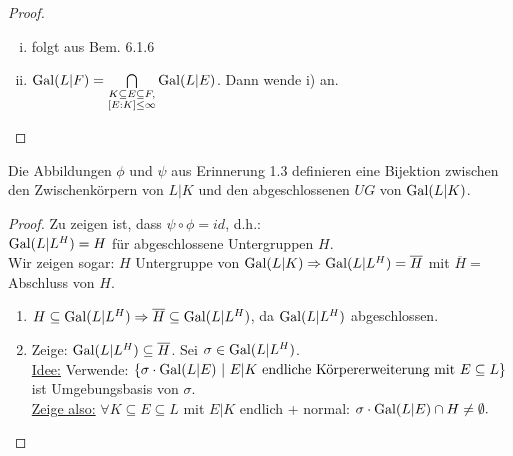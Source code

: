 \begin{proof}
\begin{enumerate}[i)]
\item folgt aus Bem. 6.1.6
\item $\operatorname{Gal}(L|F) = \bigcap \limits_{\substack{K \subseteq E \subseteq F,\\ [E:K] \leq \infty}} \operatorname{Gal}(L|E)$. Dann wende i) an.
\end{enumerate}
\end{proof}

\begin{Satz}
Die Abbildungen $\phi$ und $\psi$ aus Erinnerung 1.3 definieren eine Bijektion zwischen den Zwischenkörpern von $L|K$ und den abgeschlossenen $UG$ von $\operatorname{Gal}(L|K)$.
\end{Satz}

\begin{proof}
Zu zeigen ist, dass $\psi \circ \phi = id$, d.h.:\\
$\operatorname{Gal}(L|L^H)=H$ für abgeschlossene Untergruppen $H$.\\
Wir zeigen sogar: $H$ Untergruppe von $\operatorname{Gal}(L|K) \Rightarrow \operatorname{Gal}(L|L^H)=\overline{H}$ mit $\overline{H}=$ Abschluss von $H$.
\begin{enumerate}[(1)]
\item $H \subseteq \operatorname{Gal}(L|L^H) \Rightarrow \overline{H} \subseteq \operatorname{Gal}(L|L^H)$, da $\operatorname{Gal}(L|L^H)$ abgeschlossen.
\item Zeige: $\operatorname{Gal}(L|L^H) \subseteq \overline{H}$. Sei $\sigma \in \operatorname{Gal}(L|L^H)$.\\
\underline{Idee:} Verwende: $\{\sigma \cdot \operatorname{Gal}(L|E) \ | \ E|K \text{ endliche Körpererweiterung mit } E \subseteq L \}$ ist Umgebungsbasis von $\sigma$.\\
\underline{Zeige also:} $\forall K \subseteq E \subseteq L$ mit $E|K$ endlich + normal: $\sigma \cdot \operatorname{Gal}(L|E) \cap H \neq \emptyset.$


\end{enumerate}
\end{proof}

